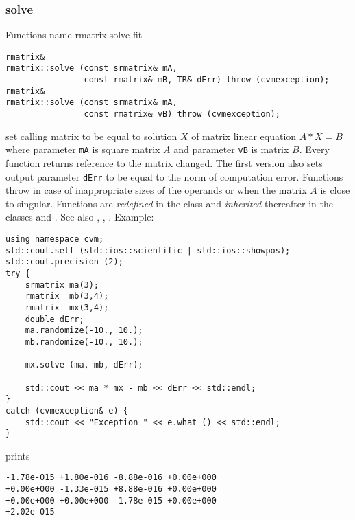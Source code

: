 \subsubsection{solve}
Functions%
\pdfdest name {rmatrix.solve} fit
\begin{verbatim}
rmatrix&
rmatrix::solve (const srmatrix& mA,
                const rmatrix& mB, TR& dErr) throw (cvmexception);
rmatrix&
rmatrix::solve (const srmatrix& mA,
                const rmatrix& vB) throw (cvmexception);
\end{verbatim}
set  calling matrix to be equal to  solution $X$ of 
matrix linear equation
$A*X=B$ where parameter \verb"mA" is square matrix $A$
and parameter \verb"vB" is matrix $B$.
Every function returns  reference to the matrix changed.
The first version also sets  output parameter \verb"dErr" to be equal
to the norm of computation error.
Functions throw 
in case of inappropriate sizes
of the operands or when the matrix $A$ is close to singular.
Functions are \emph{redefined} in  the class
 and
\emph{inherited} thereafter in the classes
 and
.
See also
,
,
.
Example:
\begin{Verbatim}
using namespace cvm;
std::cout.setf (std::ios::scientific | std::ios::showpos);
std::cout.precision (2);
try {
    srmatrix ma(3);
    rmatrix  mb(3,4);
    rmatrix  mx(3,4);
    double dErr;
    ma.randomize(-10., 10.);
    mb.randomize(-10., 10.);

    mx.solve (ma, mb, dErr);

    std::cout << ma * mx - mb << dErr << std::endl;
}
catch (cvmexception& e) {
    std::cout << "Exception " << e.what () << std::endl;
}
\end{Verbatim}
prints
\begin{Verbatim}
-1.78e-015 +1.80e-016 -8.88e-016 +0.00e+000
+0.00e+000 -1.33e-015 +8.88e-016 +0.00e+000
+0.00e+000 +0.00e+000 -1.78e-015 +0.00e+000
+2.02e-015
\end{Verbatim}
\newpage





